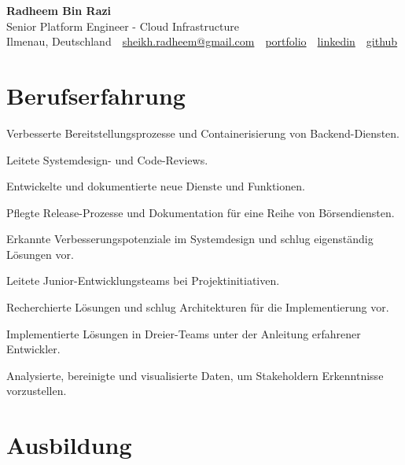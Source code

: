 \documentclass[11pt,a4paper]{resume}
\makeatletter
\newcommand{\Portfolio}{https://radheem.github.io/my-cv}
\newcommand{\PortfolioText}{portfolio}
\newcommand{\GitHub}{https://github.com/radheem}
\newcommand{\LinkedIn}{https://www.linkedin.com/in/radheem-razi}
\newcommand{\Email}{sheikh.radheem@gmail.com}
\makeatother
\begin{document}
\clearpage
{}

\begin{center}
  {\huge\bfseries Radheem Bin Razi}\\[3pt]
  {\large Senior Platform Engineer - Cloud Infrastructure}\\[6pt]
  \small
  Ilmenau, Deutschland \,\textbar\,
  \href{mailto:\Email}{\Email} \,\textbar\,
  \href{\Portfolio}{\PortfolioText} \,\textbar\,
  \href{\LinkedIn}{linkedin} \,\textbar\,
  \href{\GitHub}{github}
\end{center}
\vspace{2pt}

\section{Berufserfahrung}

\bullets
  \item Verbesserte Bereitstellungsprozesse und Containerisierung von Backend-Diensten.
  \item Leitete Systemdesign- und Code-Reviews.
  \item Entwickelte und dokumentierte neue Dienste und Funktionen.
\bulletsend
\vspace{3pt}
\bullets
  \item Pflegte Release-Prozesse und Dokumentation für eine Reihe von Börsendiensten.
  \item Erkannte Verbesserungspotenziale im Systemdesign und schlug eigenständig Lösungen vor.
  \item Leitete Junior-Entwicklungsteams bei Projektinitiativen.
\bulletsend
\vspace{3pt}
\bullets
  \item Recherchierte Lösungen und schlug Architekturen für die Implementierung vor.
  \item Implementierte Lösungen in Dreier-Teams unter der Anleitung erfahrener Entwickler.
  \item Analysierte, bereinigte und visualisierte Daten, um Stakeholdern Erkenntnisse vorzustellen.
\bulletsend
\vspace{3pt}

\section{Ausbildung}
\end{document}
